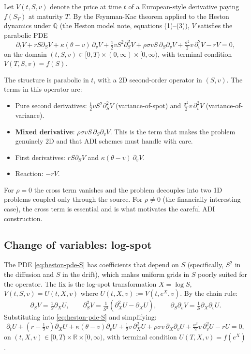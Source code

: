 \documentclass[11pt]{article}
\theoremstyle{plain}
\theoremstyle{definition}
\theoremstyle{remark}
\begin{document}
Let $V(t, S, v)$ denote the price at time $t$ of a European-style derivative paying $f(S_T)$ at maturity $T$. By the Feynman-Kac theorem applied to the Heston dynamics under $\mathbb{Q}$ (the Heston model note, equations (1)--(3)), $V$ satisfies the parabolic PDE
\begin{equation}
    \partial_t V + r S \partial_S V + \kappa(\theta - v)\, \partial_v V + \tfrac12 v S^2 \partial^2_S V + \rho \sigma v S\, \partial_S \partial_v V + \tfrac{\sigma^2}{2} v\, \partial^2_v V - r V = 0,                                  \label{eq:heston-pde-S}
\end{equation}
on the domain $(t, S, v) \in [0, T) \times (0, \infty) \times [0, \infty)$, with terminal condition $V(T, S, v) = f(S)$.

The structure is parabolic in $t$, with a 2D second-order operator in $(S, v)$. The terms in this operator are:
\begin{itemize}[topsep=2pt]
    \item Pure second derivatives: $\tfrac12 v S^2 \partial^2_S V$ (variance-of-spot) and $\tfrac{\sigma^2}{2} v\, \partial^2_v V$ (variance-of-variance).
    \item \textbf{Mixed derivative}: $\rho \sigma v S\, \partial_S \partial_v V$. This is the term that makes the problem genuinely 2D and that ADI schemes must handle with care.
    \item First derivatives: $r S \partial_S V$ and $\kappa(\theta - v)\, \partial_v V$.
    \item Reaction: $-r V$.
\end{itemize}
For $\rho = 0$ the cross term vanishes and the problem decouples into two 1D problems coupled only through the source. For $\rho \neq 0$ (the financially interesting case), the cross term is essential and is what motivates the careful ADI construction.

\subsection{Change of variables: log-spot}

The PDE \eqref{eq:heston-pde-S} has coefficients that depend on $S$ (specifically, $S^2$ in the diffusion and $S$ in the drift), which makes uniform grids in $S$ poorly suited for the operator. The fix is the log-spot transformation $X = \log S$, $V(t, S, v) = U(t, X, v)$ where $U(t, X, v) := V(t, e^X, v)$. By the chain rule:
\[
    \partial_S V = \tfrac{1}{S} \partial_X U, \qquad
    \partial^2_S V = \tfrac{1}{S^2} (\partial^2_X U - \partial_X U), \qquad
    \partial_S \partial_v V = \tfrac{1}{S} \partial_X \partial_v U.
\]
Substituting into \eqref{eq:heston-pde-S} and simplifying:
\begin{equation}
    \partial_t U + (r - \tfrac12 v) \partial_X U + \kappa(\theta - v) \partial_v U + \tfrac12 v\, \partial^2_X U + \rho\sigma v\, \partial_X \partial_v U + \tfrac{\sigma^2}{2} v\, \partial^2_v U - r U = 0,                            \label{eq:heston-pde-X}
\end{equation}
on $(t, X, v) \in [0, T) \times \mathbb{R} \times [0, \infty)$, with terminal condition $U(T, X, v) = f(e^X)$.
\end{document}
